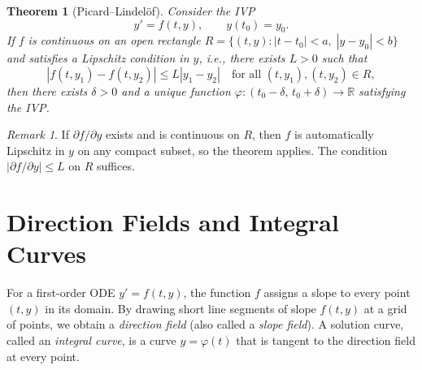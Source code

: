 \documentclass[12pt,a4paper,openany]{book}
\theoremstyle{definition}
\theoremstyle{plain}
\newtheorem{theorem}[definition]{Theorem}
\theoremstyle{remark}
\newtheorem{remark}[definition]{Remark}
\newcommand{\R}{\mathbb{R}}
\newcommand{\abs}[1]{\left|#1\right|}
\begin{document}
\begin{theorem}[Picard--Lindel\"of]
\label{thm:picard-lindelof-preview}
Consider the IVP
\[
  y' = f(t,y), \qquad y(t_0)=y_0.
\]
If $f$ is continuous on an open rectangle $R = \{(t,y) : \abs{t-t_0}<a,\;\abs{y-y_0}<b\}$ and satisfies a Lipschitz condition in $y$, i.e., there exists $L>0$ such that
\[
  \abs{f(t,y_1)-f(t,y_2)} \le L\abs{y_1-y_2}
  \quad\text{for all } (t,y_1),(t,y_2)\in R,
\]
then there exists $\delta>0$ and a unique function $\varphi\colon(t_0-\delta,\,t_0+\delta)\to\R$ satisfying the IVP.
\end{theorem}

\begin{remark}
\label{rem:lipschitz-sufficient}
If $\partial f/\partial y$ exists and is continuous on $R$, then $f$ is automatically Lipschitz in $y$ on any compact subset, so the theorem applies. The condition $\abs{\partial f/\partial y}\le L$ on $R$ suffices.
\end{remark}

\section{Direction Fields and Integral Curves}
\label{sec:direction-fields}

For a first-order ODE $y' = f(t,y)$, the function $f$ assigns a slope to every point $(t,y)$ in its domain. By drawing short line segments of slope $f(t,y)$ at a grid of points, we obtain a \emph{direction field} (also called a \emph{slope field}). A solution curve, called an \emph{integral curve}, is a curve $y = \varphi(t)$ that is tangent to the direction field at every point.
\end{document}
